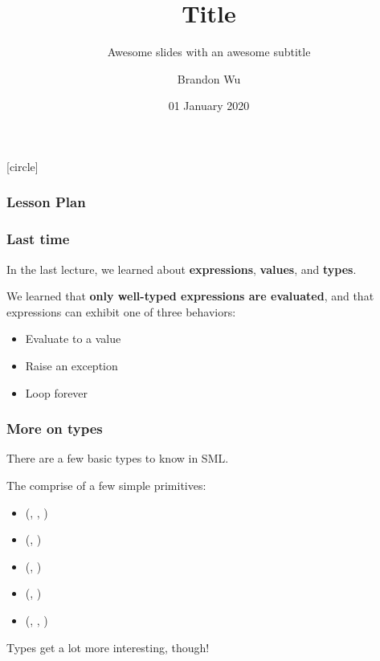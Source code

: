 \documentclass[aspectratio=169]{beamer}
\title{Title} %
\subtitle{Awesome slides with an awesome subtitle} %
\date{01 January 2020} %
\author{Brandon Wu} %
\newif\ifcolorlambda
\begin{document}
\ifweb
    \renewcommand{\pause}{}
\fi

[circle]

{
\begin{frame}[plain]
    \colorlambdatrue
    \titlepage
\end{frame}
}

\begin{frame}[fragile]
  \frametitle{Lesson Plan}

  \tableofcontents
\end{frame}

\begin{frame}[fragile]
  \frametitle{Last time}

  In the last lecture, we learned about \textbf{expressions}, \textbf{values}, and \textbf{types}.

  \vspace{5pt}

  We learned that \textbf{only well-typed expressions are evaluated}, and that expressions can 
  exhibit one of three behaviors:

  \vspace{\fill}

  \begin{itemize}
    \item Evaluate to a value
    \item Raise an exception
    \item Loop forever
  \end{itemize}
\end{frame}


\begin{frame}[fragile]
  \frametitle{More on types}

  There are a few basic types to know in SML.

  \vspace{10pt}

  The  comprise of a few simple primitives:

  \vspace{5pt}

  \begin{itemize}
    \item {} (, , )
    \item {} (, )
    \item {} (, )
    \item {} (, )
    \item {} (, , )
  \end{itemize}

  \vspace{\fill}

  Types get a lot more interesting, though!
\end{frame}
\end{document}
